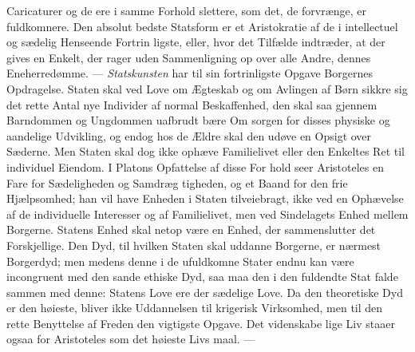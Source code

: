 \documentclass[12pt,a4paper]{book}
\begin{document}
Caricaturer og de ere i samme Forhold slettere, som det, de
forvrænge, er fuldkomnere. Den absolut bedste Statsform er et
Aristokratie af de i intellectuel og sædelig Henseende Fortrin\-%
ligste, eller, hvor det Tilfælde indtræder, at der gives en Enkelt,
der rager uden Sammenligning op over alle Andre, dennes
Eneherredømme. --- \emph{Statskunsten} har til sin fortrinligste
Opgave Borgernes Opdragelse. Staten skal ved Love om
Ægteskab og om Avlingen af Børn sikkre sig det rette
Antal nye Individer af normal Beskaffenhed, den skal saa
gjennem Barndommen og Ungdommen uafbrudt bære Om\-%
sorgen for disses physiske og aandelige Udvikling, og endog
hos de Ældre skal den udøve en Opsigt over Sæderne. Men
Staten skal dog ikke ophæve Familielivet eller den Enkeltes
Ret til individuel Eiendom. I Platons Opfattelse af disse For\-%
hold seer Aristoteles en Fare for Sædeligheden og Samdræg\-%
tigheden, og et Baand for den frie Hjælpsomhed; han vil have
Enheden i Staten tilveiebragt, ikke ved en Ophævelse af de
individuelle Interesser og af Familielivet, men ved Sindelagets
Enhed mellem Borgerne. Statens Enhed skal netop være en
Enhed, der sammenslutter det Forskjellige. Den Dyd, til
hvilken Staten skal uddanne Borgerne, er nærmest Borgerdyd;
men medens denne i de ufuldkomne Stater endnu kan være
incongruent med den sande ethiske Dyd, saa maa den i den
fuldendte Stat falde sammen med denne: Statens Love ere der
sædelige Love. Da den theoretiske Dyd er den høieste, bliver
ikke Uddannelsen til krigerisk Virksomhed, men til den rette
Benyttelse af Freden den vigtigste Opgave. Det videnskabe\-%
lige Liv staaer ogsaa for Aristoteles som det høieste Livs\-%
maal. ---
\end{document}
